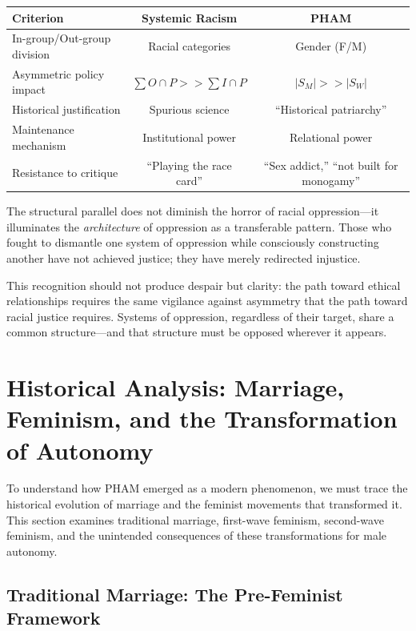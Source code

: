 \documentclass[12pt, letterpaper]{article}
\begin{document}
\begin{center}
\begin{tabular}{lcc}
\toprule
\textbf{Criterion} & \textbf{Systemic Racism} & \textbf{PHAM} \\
\midrule
In-group/Out-group division & Racial categories & Gender (F/M) \\
Asymmetric policy impact & $\sum O \cap P >> \sum I \cap P$ & $|S_M| >> |S_W|$ \\
Historical justification & Spurious science & ``Historical patriarchy'' \\
Maintenance mechanism & Institutional power & Relational power \\
Resistance to critique & ``Playing the race card'' & ``Sex addict,'' ``not built for monogamy'' \\
\bottomrule
\end{tabular}
\end{center}

The structural parallel does not diminish the horror of racial oppression---it illuminates the \textit{architecture} of oppression as a transferable pattern. Those who fought to dismantle one system of oppression while consciously constructing another have not achieved justice; they have merely redirected injustice.

This recognition should not produce despair but clarity: the path toward ethical relationships requires the same vigilance against asymmetry that the path toward racial justice requires. Systems of oppression, regardless of their target, share a common structure---and that structure must be opposed wherever it appears.

\section{Historical Analysis: Marriage, Feminism, and the Transformation of Autonomy}

To understand how PHAM emerged as a modern phenomenon, we must trace the historical evolution of marriage and the feminist movements that transformed it. This section examines traditional marriage, first-wave feminism, second-wave feminism, and the unintended consequences of these transformations for male autonomy.

\subsection{Traditional Marriage: The Pre-Feminist Framework}
\end{document}
